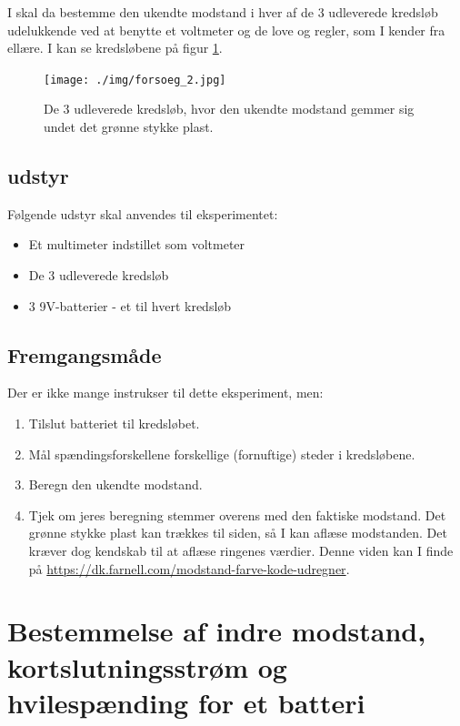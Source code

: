 \documentclass[a4paper, 12pt]{article}
\begin{document}
I skal da bestemme den ukendte modstand i hver af de 3 udleverede kredsløb udelukkende ved at benytte et voltmeter og de love og regler, som I kender fra ellære. I kan se kredsløbene på figur \ref{forsoeg_2}.

\begin{figure}[htbp]
\centering
\texttt{[image: ./img/forsoeg\_2.jpg]}
\caption{\label{forsoeg_2}De 3 udleverede kredsløb, hvor den ukendte modstand gemmer sig undet det grønne stykke plast.}
\end{figure}

\subsection{udstyr}
\label{sec:org7b92d85}

Følgende udstyr skal anvendes til eksperimentet:

\begin{itemize}[noitemsep]
\item Et multimeter indstillet som voltmeter
\item De 3 udleverede kredsløb
\item 3 9V-batterier - et til hvert kredsløb
\end{itemize}

\subsection{Fremgangsmåde}
\label{sec:org0760200}

Der er ikke mange instrukser til dette eksperiment, men:

\begin{enumerate}[noitemsep]
\item Tilslut batteriet til kredsløbet.
\item Mål spændingsforskellene forskellige (fornuftige) steder i kredsløbene.
\item Beregn den ukendte modstand.
\item Tjek om jeres beregning stemmer overens med den faktiske modstand. Det grønne stykke plast kan trækkes til siden, så I kan aflæse modstanden. Det kræver dog kendskab til at aflæse ringenes værdier. Denne viden kan I finde på \url{https://dk.farnell.com/modstand-farve-kode-udregner}.
\end{enumerate}
\newpage

\section{Bestemmelse af indre modstand, kortslutningsstrøm og hvilespænding for et batteri}
\label{sec:orgc9808f5}
\end{document}
